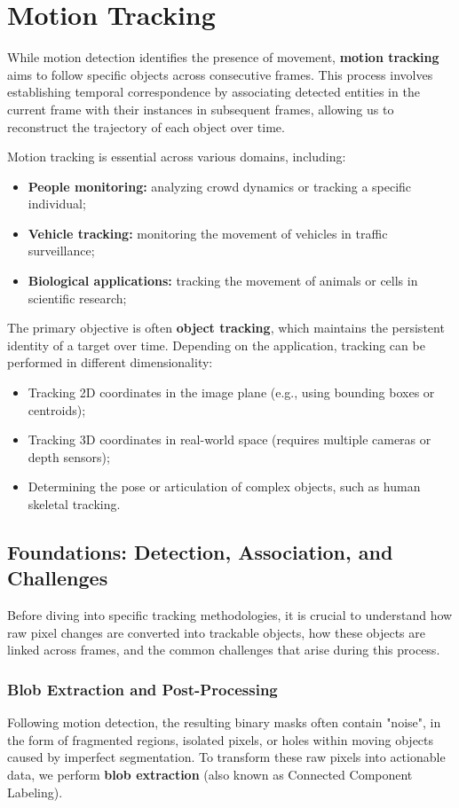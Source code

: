 \section{Motion Tracking}
While motion detection identifies the presence of movement, \textbf{motion tracking} aims to 
follow specific objects across consecutive frames. 
This process involves establishing temporal correspondence by associating detected entities in the current 
frame with their instances in subsequent frames, allowing us to reconstruct the trajectory of each object over time.

Motion tracking is essential across various domains, including:
\begin{itemize}
    \item \textbf{People monitoring:} analyzing crowd dynamics or tracking a specific individual;
    \item \textbf{Vehicle tracking:} monitoring the movement of vehicles in traffic surveillance;
    \item \textbf{Biological applications:} tracking the movement of animals or cells in scientific research;
\end{itemize}

The primary objective is often \textbf{object tracking}, which maintains the persistent identity of a target over time. 
Depending on the application, tracking can be performed in different dimensionality:
\begin{itemize}
\item Tracking 2D coordinates in the image plane (e.g., using bounding boxes or centroids);
\item Tracking 3D coordinates in real-world space (requires multiple cameras or depth sensors);
\item Determining the pose or articulation of complex objects, such as human skeletal tracking.
\end{itemize}

\subsection{Foundations: Detection, Association, and Challenges}
Before diving into specific tracking methodologies, it is crucial to understand how raw pixel changes are converted into trackable objects, how these objects are linked across frames, and the common challenges that arise during this process.

\subsubsection{Blob Extraction and Post-Processing}
Following motion detection, the resulting binary masks often contain "noise", in the form of fragmented regions, 
isolated pixels, or holes within moving objects caused by imperfect segmentation. 
To transform these raw pixels into actionable data, we perform \textbf{blob extraction} (also known as Connected Component Labeling).

